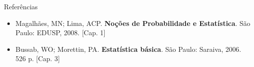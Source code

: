 \documentclass[10pt]{beamer}\usepackage[]{graphicx}\usepackage[]{color}
\theoremstyle{definition}
\begin{document}





\begin{frame}{Referências}
  \begin{itemize}
  \item Magalhães, MN; Lima, ACP. \textbf{Noções de Probabilidade e
    Estatística}. São Paulo: EDUSP, 2008. [Cap. 1]
  \item Bussab, WO; Morettin, PA. \textbf{Estatística básica}. São
    Paulo: Saraiva, 2006. 526 p. [Cap. 3]
  \end{itemize}
\end{frame}
\end{document}
